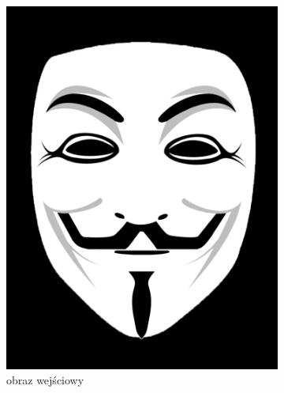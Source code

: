 \begin{figure}[H]
\begin{subfigure}{0.24\textwidth}
        \includegraphics[width = \textwidth]{img/6-comp/fawkes_original_c20_inv0.png}
        \caption{obraz wejściowy}
        \label{comp-comp-dali-turing-fawkes-i}
    \end{subfigure}
    \begin{subfigure}{0.24\textwidth}
        \centering

\end{subfigure}
\end{figure}
